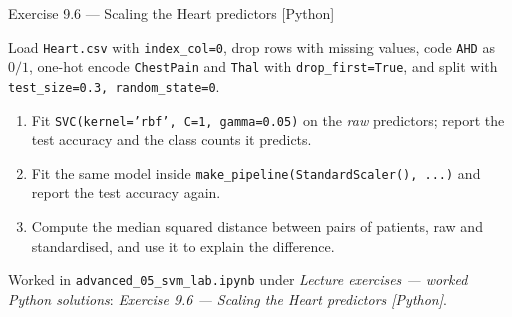 \documentclass[aspectratio=169,11pt]{beamer}
\begin{document}
\begin{frame}{Exercise 9.6 --- Scaling the Heart predictors [Python]}
\begin{exercise}
  Load \texttt{Heart.csv} with \texttt{index\_col=0}, drop rows with missing
  values, code \texttt{AHD} as $0/1$, one-hot encode \texttt{ChestPain} and
  \texttt{Thal} with \texttt{drop\_first=True}, and split with
  \texttt{test\_size=0.3, random\_state=0}.
  \begin{enumerate}
    \item Fit \texttt{SVC(kernel='rbf', C=1, gamma=0.05)} on the \emph{raw}
          predictors; report the test accuracy and the class counts it predicts.
    \item Fit the same model inside
          \texttt{make\_pipeline(StandardScaler(), ...)} and report the test
          accuracy again.
    \item Compute the median squared distance between pairs of patients, raw
          and standardised, and use it to explain the difference.
  \end{enumerate}
\end{exercise}
\begin{labnote}
  Worked in \texttt{advanced\_05\_svm\_lab.ipynb} under \emph{Lecture exercises
  --- worked Python solutions}: \emph{Exercise 9.6 --- Scaling the Heart
  predictors [Python]}.
\end{labnote}
\end{frame}
\end{document}
